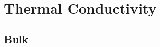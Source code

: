\documentclass[aps,prb,onecolumn,preprint,superscriptaddress,footinbib,amsmath,amssymb,floatfix]{revtex4}
\begin{document}


\section{\label{S:Conductivity}Thermal Conductivity}

\subsection{\label{S:Bulk}Bulk}
\end{document}
